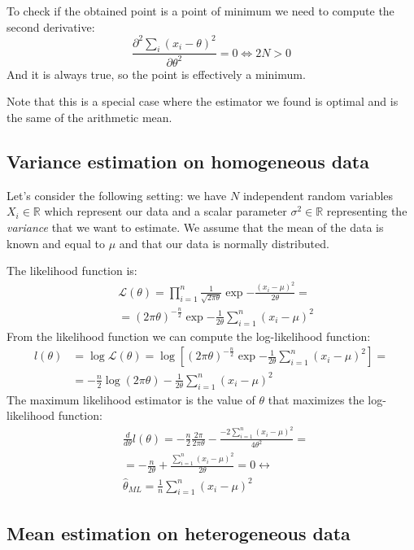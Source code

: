 To check if the obtained point is a point of minimum we need to compute the second derivative:
\[
    \frac{\partial^2 \sum_i(x_i-\theta)^2}{\partial \theta^2} = 0 \Leftrightarrow 2N > 0
\]
And it is always true, so the point is effectively a minimum.

Note that this is a special case where the estimator we found is optimal and is the same of the arithmetic mean.

\subsection{Variance estimation on homogeneous data}
Let's consider the following setting: we have $N$ independent random variables $X_i \in \mathbb{R}$ which represent our data and a scalar parameter $\sigma^2 \in \mathbb{R}$ representing the \textit{variance} that we want to estimate. We assume that the mean of the data is known and equal to $\mu$ and that our data is normally distributed.

The likelihood function is:
\begin{align*}
    &\mathcal{L}(\theta)=\prod_{i=1}^n\frac{1}{\sqrt{2\pi\theta}}\exp{-\frac{(x_i-\mu)^2}{2\theta}}=\\
    &=(2\pi\theta)^{-\frac{n}{2}}\exp{-\frac{1}{2\theta}\sum_{i=1}^n(x_i-\mu)^2} 
\end{align*}
From the likelihood function we can compute the log-likelihood function:
\begin{align*}
    l(\theta)&=\log\mathcal{L}(\theta)=\log\left [ (2\pi\theta)^{-\frac{n}{2}}\exp{-\frac{1}{2\theta}\sum_{i=1}^n(x_i-\mu)^2}\right ]=\\
    &=-\frac{n}{2}\log(2\pi\theta)-\frac{1}{2\theta}\sum_{i=1}^n(x_i-\mu)^2 
\end{align*}
The maximum likelihood estimator is the value of $\theta$ that maximizes the log-likelihood function:
\begin{align*}    
&\frac{d}{d\theta}l(\theta)=-\frac{n}{2}\frac{2\pi}{2\pi\theta}-\frac{-2\sum_{i=1}^n(x_i-\mu)^2}{4\theta^2}=\\
&=-\frac{n}{2\theta}+\frac{\sum_{i=1}^n(x_i-\mu)^2}{2\theta}=0 \leftrightarrow\\
&\hat\theta_{ML}=\frac{1}{n}\sum_{i=1}^n(x_i-\mu)^2 
\end{align*}


\subsection{Mean estimation on heterogeneous data} \label{sec:ex_1}

